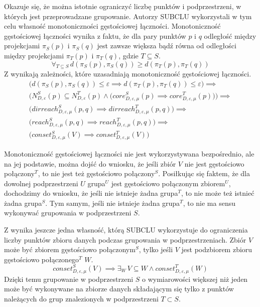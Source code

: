 Okazuje się, że można istotnie ograniczyć liczbę punktów i podprzestrzeni, w których jest przeprowadzane grupowanie. Autorzy SUBCLU \cite{subclu} wykorzystali w tym celu własność monotoniczności gęstościowej łączności. Monotoniczność gęstościowej łączności wynika z faktu, że dla pary punktów $ p $ i $ q $ odległość między projekcjami $ \pi_S(p) $ i $ \pi_S(q) $ jest zawsze większa bądź równa od odległości między projekcjami $ \pi_T(p) $ i $ \pi_T(q) $, gdzie $ T \subseteq S $. 
\begin{equation}\label{eq:d-vs-d-projected}
\forall_{T\subseteq S}\,d(\pi_S(p),\pi_S(q)) \geq d(\pi_T(p), \pi_T(q))
\end{equation}
Z  wynikają zależności, które uzasadniają monotoniczność gęstościowej łączności.
\begin{equation}
	\begin{array}{l}
		\big(d(\pi_S(p),\pi_S(q)) \le \varepsilon \implies d(\pi_T(p), \pi_T(q)) \le \varepsilon\big) \implies\\
		\big(N^S_{D,\varepsilon}(p) \subseteq N^T_{D,\varepsilon}(p) \land \big(core^S_{D,\varepsilon,\mu}(p) \implies core^T_{D,\varepsilon,\mu}(p)\big)\big) \implies \\
		\big(dirreach^S_{D,\varepsilon,\mu}(p, q) \implies dirreach^T_{D,\varepsilon,\mu}(p, q)\big) \implies \\
		\big(reach^S_{D,\varepsilon,\mu}(p, q) \implies reach^T_{D,\varepsilon,\mu}(p, q)\big) \implies \\
		\big(conset^S_{D,\varepsilon,\mu}(V) \implies conset^T_{D,\varepsilon,\mu}(V)\big)
	\end{array}
\end{equation}

Monotoniczność gęstościowej łączności nie jest wykorzystywana bezpośrednio, ale na jej podstawie, można dojść do wniosku, że jeśli zbiór $ V $ nie jest gęstościowo połączony$^T$, to nie jest też gęstościowo połączony$^S $. Posiłkując się faktem, że dla dowolnej podprzestrzeni $ U $ grupa$^U$ jest gęstościowo połączonym zbiorem$^U$, dochodzimy do wniosku, że jeśli nie istnieje żadna grupa$^T$, to nie może też istnieć żadna grupa$^S$. Tym samym, jeśli nie istnieje żadna grupa$^T$, to nie ma sensu wykonywać grupowania w podprzestrzeni $ S $.

Z  wynika jeszcze jedna własność, którą SUBCLU wykorzystuje do ograniczenia liczby punktów zbioru danych podczas grupowania w podprzestrzeniach. Zbiór $ V $ może być zbiorem gęstościowo połączonym$^S$, tylko jeśli $ V $ jest podzbiorem zbioru gęstościowo połączonego$^T$ $ W $.
\begin{equation}
 conset^S_{D,\varepsilon,\mu}(V) \implies \exists_W\,V\subseteq W \land conset^T_{D,\varepsilon,\mu}(W)
\end{equation}
Dzięki temu grupowanie w podprzestrzeni $ S $ o wymiarowości większej niż jeden może być wykonywane na zbiorze danych składającym się tylko z punktów należących do grup znalezionych w podprzestrzeni $ T \subset S $.

